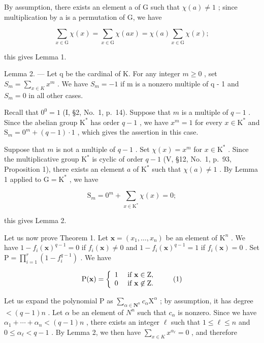 By assumption, there exists an element a of G such that \(\chi(a) \neq 1\) ; since multiplication by a is a permutation of G, we have

\[
\sum_ {x \in \mathrm{G}} \chi (x) = \sum_ {x \in \mathrm{G}} \chi (a x) = \chi (a) \sum_ {x \in \mathrm{G}} \chi (x);
\]

this gives Lemma 1.

Lemma 2. --- Let q be the cardinal of K. For any integer \(m \geqslant 0\) , set \(S_{m} = \sum_{x \in K} x^{m}\) . We have \(S_{m} = -1\) if m is a nonzero multiple of q - 1 and \(S_{m} = 0\) in all other cases.

Recall that \(0^0 = 1\) (I, §2, No.~1, p.~14). Suppose that \(m\) is a multiple of \(q - 1\) . Since the abelian group \(\mathrm{K}^*\) has order \(q - 1\) , we have \(x^m = 1\) for every \(x \in \mathrm{K}^*\) and \(\mathrm{S}_m = 0^m + (q - 1) \cdot 1\) , which gives the assertion in this case.

Suppose that \(m\) is not a multiple of \(q - 1\) . Set \(\chi(x) = x^m\) for \(x \in \mathrm{K}^*\) . Since the multiplicative group \(\mathrm{K}^*\) is cyclic of order \(q - 1\) (V, §12, No.~1, p.~93, Proposition 1), there exists an element \(a\) of \(\mathrm{K}^*\) such that \(\chi(a) \neq 1\) . By Lemma 1 applied to \(\mathrm{G} = \mathrm{K}^*\) , we have

\[
\mathrm{S} _ {m} = 0 ^ {m} + \sum_ {x \in \mathrm{K} ^ {*}} \chi (x) = 0;
\]

this gives Lemma 2.

Let us now prove Theorem 1. Let \(\mathbf{x} = (x_1, \ldots, x_n)\) be an element of \(\mathrm{K}^n\) . We have \(1 - f_i(\mathbf{x})^{q-1} = 0\) if \(f_i(\mathbf{x}) \neq 0\) and \(1 - f_i(\mathbf{x})^{q-1} = 1\) if \(f_i(\mathbf{x}) = 0\) . Set \(\mathrm{P} = \prod_{i=1}^{r}(1 - f_i^{q-1})\) . We have

\[
\mathrm{P} (\mathbf {x}) = \left\{ \begin{array}{l l} 1 & \text { if } \mathbf {x} \in \mathrm{Z}, \\ 0 & \text { if } \mathbf {x} \not \in \mathrm{Z}. \end{array} \right.\tag{1}
\]

Let us expand the polynomial P as \(\sum_{\alpha\in\mathbf{N}^{n}}c_{\alpha}\mathrm{X}^{\alpha}\) ; by assumption, it has degree \(< (q-1)n\) . Let \(\alpha\) be an element of \(N^{n}\) such that \(c_{\alpha}\) is nonzero. Since we have \(\alpha_{1}+\cdots+\alpha_{n}<(q-1)n\) , there exists an integer \(\ell\) such that \(1\leqslant\ell\leqslant n\) and \(0\leqslant\alpha_{\ell}<q-1\) . By Lemma 2, we then have \(\sum_{x\in K}x^{\alpha_{\ell}}=0\) , and therefore

